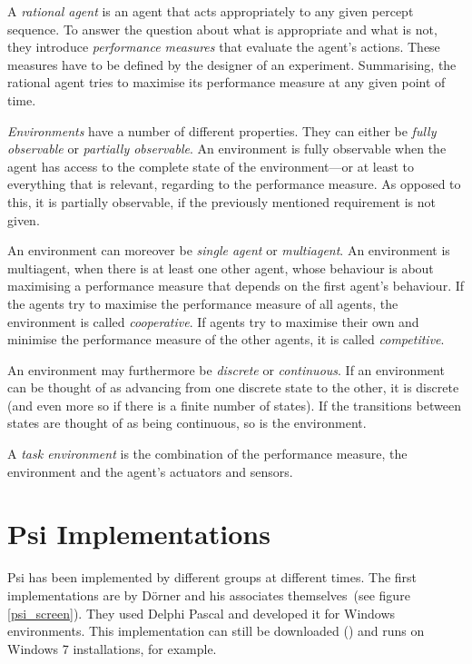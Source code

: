 A \emph{rational agent} is an agent that acts appropriately to any given percept sequence. To answer the question about what is appropriate and what is not, they introduce \emph{performance measures} that evaluate the agent's actions. These measures have to be defined by the designer of an experiment. Summarising, the rational agent tries to maximise its performance measure at any given point of time.


\emph{Environments} have a number of different properties. They can either be \emph{fully observable} or \emph{partially observable}. An environment is fully observable when the agent has access to the complete state of the environment---or at least to everything that is relevant, regarding to the performance measure. As opposed to this, it is partially observable, if the previously mentioned requirement is not given.

An environment can moreover be \emph{single agent} or \emph{multiagent}. An environment is multiagent, when there is at least one other agent, whose behaviour is about maximising a performance measure that depends on the first agent's behaviour. If the agents try to maximise the performance measure of all agents, the environment is called \emph{cooperative}. If agents try to maximise their own and minimise the performance measure of the other agents, it is called \emph{competitive}.

An environment may furthermore be \emph{discrete} or \emph{continuous}. If an environment can be thought of as advancing from one discrete state to the other, it is discrete (and even more so if there is a finite number of states). If the transitions between states are thought of as being continuous, so is the environment.

A \emph{task environment} is the combination of the performance measure, the environment and the agent's actuators and sensors.

    \section{Psi Implementations}
Psi has been implemented by different groups at different times. The first implementations are by Dörner and his associates themselves~(see figure \ref{psi_screen}). They used Delphi Pascal and developed it for Windows environments. This implementation can still be downloaded (\cite{PsiDownload}) and runs on Windows 7 installations, for example. 

